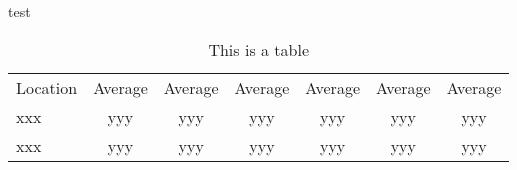 \documentclass[hess]{copernicus}%
\begin{document}
test


%
\begin{table*}[t]
  \caption{This is a table
  }
\begin{tabular}{l | c c c c c c}
Location  &  Average    &   Average    & Average   & Average    &  Average  & Average   \\

\tophline
xxx  &  yyy  &  yyy & yyy  & yyy & yyy & yyy   \\
xxx &  yyy  &  yyy & yyy  &  yyy &  yyy & yyy \\
%
%
%
\end{tabular}
\belowtable{} %
\label{Result_table}
\end{table*}
\end{document}
